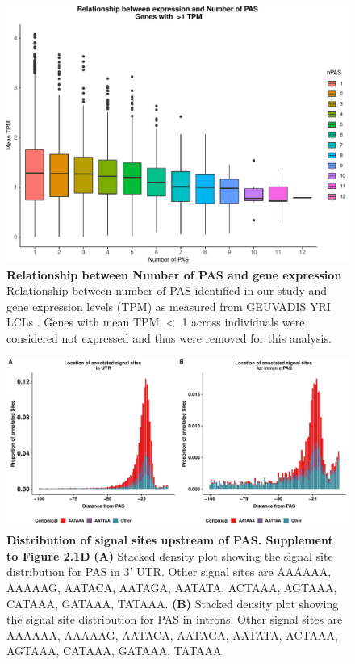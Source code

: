 \begin{figure}[!htb]
\centering
\includegraphics[width=5in]{img/ch02/Fig1_figuresupplement1.pdf}
\caption[Relationship between Number of PAS and gene expression]{\textbf{Relationship between Number of PAS and gene expression} Relationship between number of PAS identified in our study and gene expression levels (TPM) as measured from GEUVADIS YRI LCLs \citep{lappalainen_transcriptome_2013}. Genes with mean TPM $<$ 1 across individuals were considered not expressed and thus were removed for this analysis.}
\label{fig:ch02-pas-exp}
\end{figure}
\clearpage

\begin{figure}[!htb]
\centering \includegraphics[width=5in]{img/ch02/Fig1_figuresupplement2.pdf}
\caption[Distribution of signal sites upstream of PAS. Supplement to Figure 2.1D]{\textbf{Distribution of signal sites upstream of PAS. Supplement to Figure 2.1D} {\bf (A)} Stacked density plot showing the signal site distribution for PAS in 3' UTR. Other signal sites are AAAAAA, AAAAAG, AATACA, AATAGA, AATATA, ACTAAA, AGTAAA, CATAAA, GATAAA, TATAAA. {\bf (B)} Stacked density plot showing the signal site distribution for PAS in introns. Other signal sites are AAAAAA, AAAAAG, AATACA, AATAGA, AATATA, ACTAAA, AGTAAA, CATAAA, GATAAA, TATAAA.}
\label{fig:SS}
\end{figure}
\clearpage

